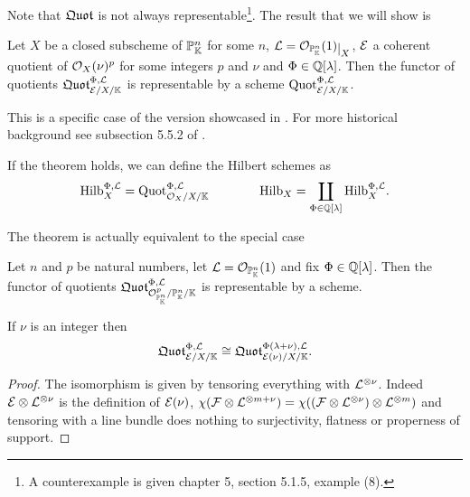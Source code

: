 Note that $\mathfrak{Quot}$ is not always representable\footnote{A counterexample is given chapter 5, section 5.1.5, example (8).}. The result that we will show is
\begin{theorem}\label{AltmanKelimanEasy}
Let $X$ be a closed subscheme of $\mathbb{P}^n_{\mathbb{K}}$ for some $n$, $\Lc=\Oc_{\Pj^n_\K}(1)\res X$, $\mathcal{E}$ a coherent quotient of $\mathcal{O}_{X}(\nu)^p$ for some integers $p$ and $\nu$ and $\Phi\in\mathbb{Q}[\lambda]$. Then the functor of quotients $\mathfrak{Quot}^{\Phi,\mathcal{L}}_{\mathcal{E}/X/\mathbb{K}}$ is representable by a scheme $\mathrm{Quot}^{\Phi,\mathcal{L}}_{\mathcal{E}/X/\mathbb{K}}$. 
\end{theorem}
This is a specific case of the version showcased in \cite{ALTMAN198050}. For more historical background see subsection 5.5.2 of \cite{FGAEXPLAINED}.

\begin{remark}
If the theorem holds, we can define the Hilbert schemes as
\[\mathrm{Hilb}^{\Phi,\mathcal{L}}_{X}=\mathrm{Quot}^{\Phi,\mathcal{L}}_{\mathcal{O}_{X}/X/\mathbb{K}}\qquad\qquad \mathrm{Hilb}_X=\coprod_{\Phi\in\mathbb{Q}[\lambda]}\mathrm{Hilb}^{\Phi,\mathcal{L}}_{X}.\]
\end{remark}

The theorem is actually equivalent to the special case
\begin{theorem}\label{AltmanKelimanEasier}
Let $n$ and $p$ be natural numbers, let $\mathcal{L}=\mathcal{O}_{\mathbb{P}^n_{\mathbb{K}}}(1)$ and fix $\Phi\in\mathbb{Q}[\lambda]$. Then the functor of quotients $\mathfrak{Quot}^{\Phi,\mathcal{L}}_{\mathcal{O}_{\mathbb{P}^n_{\mathbb{K}}}^p/\mathbb{P}^n_{\mathbb{K}}/\mathbb{K}}$ is representable by a scheme. 
\end{theorem}

\begin{lemma}\label{NoTwistLemma}
If $\nu$ is an integer then 
\[\mathfrak{Quot}^{\Phi,\mathcal{L}}_{\mathcal{E}/X/\mathbb{K}}\cong \mathfrak{Quot}^{\Phi(\lambda+\nu),\mathcal{L}}_{\mathcal{E}(\nu)/X/\mathbb{K}}.\]
\end{lemma}
\begin{proof}
The isomorphism is given by tensoring everything with $\mathcal{L}^{\otimes \nu}$. Indeed $\mathcal{E}\otimes \mathcal{L}^{\otimes \nu}$ is the definition of $\mathcal{E}(\nu)$, $\chi(\mathcal{F}\otimes \mathcal{L}^{\otimes m+\nu})=\chi((\mathcal{F}\otimes\mathcal{L}^{\otimes \nu})\otimes \mathcal{L}^{\otimes m})$ and tensoring with a line bundle does nothing to surjectivity, flatness or properness of support.
\end{proof}

